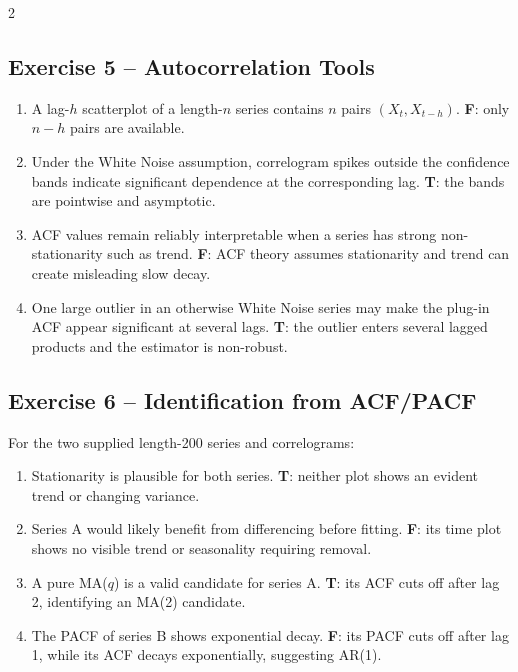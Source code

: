 \documentclass[9pt,a4paper]{extarticle}
\begin{document}
\begin{multicols}{2}
\subsection*{Exercise 5 -- Autocorrelation Tools}
\begin{enumerate}[label=\alph*),leftmargin=4mm]
\item A lag-\(h\) scatterplot of a length-\(n\) series contains \(n\) pairs \((X_t,X_{t-h})\). \textbf{F}: only \(n-h\) pairs are available.
\item Under the White Noise assumption, correlogram spikes outside the confidence bands indicate significant dependence at the corresponding lag. \textbf{T}: the bands are pointwise and asymptotic.
\item ACF values remain reliably interpretable when a series has strong non-stationarity such as trend. \textbf{F}: ACF theory assumes stationarity and trend can create misleading slow decay.
\item One large outlier in an otherwise White Noise series may make the plug-in ACF appear significant at several lags. \textbf{T}: the outlier enters several lagged products and the estimator is non-robust.
\end{enumerate}

\subsection*{Exercise 6 -- Identification from ACF/PACF}
For the two supplied length-200 series and correlograms:
\begin{enumerate}[label=\alph*),leftmargin=4mm]
\item Stationarity is plausible for both series. \textbf{T}: neither plot shows an evident trend or changing variance.
\item Series A would likely benefit from differencing before fitting. \textbf{F}: its time plot shows no visible trend or seasonality requiring removal.
\item A pure MA(\(q\)) is a valid candidate for series A. \textbf{T}: its ACF cuts off after lag 2, identifying an MA(2) candidate.
\item The PACF of series B shows exponential decay. \textbf{F}: its PACF cuts off after lag 1, while its ACF decays exponentially, suggesting AR(1).
\end{enumerate}


\end{multicols}
\end{document}
